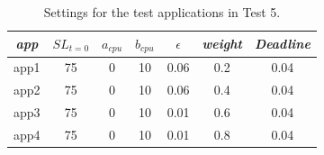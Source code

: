 \documentclass[nobiblatex]{LTHthesis}
\begin{document}
\begin{table}[h]
  \centering
  \begin{tabular}{|c|c|c|c|c|c|c|}
  \hline 
   \emph{app} & $SL_{t=0}$ & \textbf{$a_{cpu}$} & 
   \textbf{$b_{cpu}$} & \textbf{$\epsilon$} & 
   \emph{weight} & \emph{Deadline} \\ \hline
  app1 & 75 & 0 & 10 & 0.06 & 0.2 &0.04  \\ \hline
  app2 & 75 & 0 & 10 & 0.06 & 0.4 &0.04  \\ \hline
  app3 & 75 & 0 & 10 & 0.01 & 0.6 &0.04  \\ \hline
  app4 & 75 & 0 & 10 & 0.01 & 0.8 &0.04  \\ \hline		
  \end{tabular}
  \caption{Settings for the test applications in Test 5.}
  \label{tab:settings_test5}
\end{table}
\end{document}
